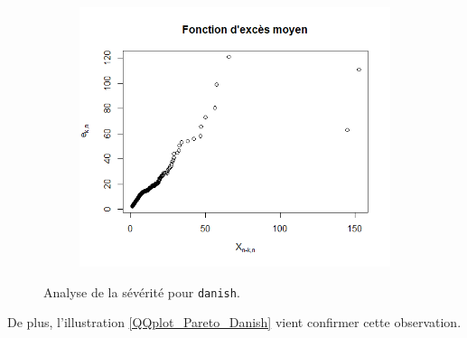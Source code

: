 \begin{figure}[H]
\begin{center}
\begin{subfigure}[b]{0.3\textwidth}
				\includegraphics[scale=0.35]{Graphiques/Graph_Danish_MeanExcess} 
				\caption{} \label{Graph_Danish_MeanExcess}
			\end{subfigure}
			\renewcommand{\figurename}{Illustration}
			\caption{Analyse de la sévérité pour \texttt{danish}.}\label{Hist_Danish}
			\end{center}
		\end{figure}
		
		De plus, l'illustration \ref{QQplot_Pareto_Danish} vient confirmer cette observation.
		
